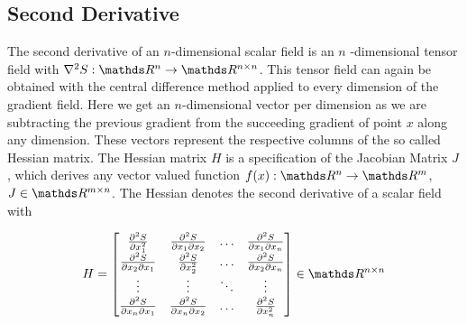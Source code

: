\subsection{Second Derivative}

The second derivative of an $n$-dimensional scalar field is an $n$
-dimensional tensor field with $\nabla^2 S:\real^n \rightarrow \real^{n
\times n}$. This tensor field can again be obtained with the central
difference method applied to every dimension of the gradient field. Here
we get an $n$-dimensional vector per dimension as we are subtracting the
previous gradient from the succeeding gradient of point $x$ along any
dimension. These vectors represent the respective columns of the so
called Hessian matrix. The Hessian matrix $H$ is a specification of the
Jacobian Matrix $J$, which derives any vector valued function $f(x):
\real^n \rightarrow \real^m$, $J \in \real^{m \times n}$. The Hessian
denotes the second derivative of a scalar field with

\begin{equation}
  H =
  \begin{bmatrix}
    \frac{\partial^2 S}{\partial x_1^2} & \frac{\partial^2 S}{\partial x_1 \partial x_2} & \dots & \frac{\partial^2 S}{\partial x_1 \partial x_n}\\
    \frac{\partial^2 S}{\partial x_2 \partial x_1} & \frac{\partial^2 S}{\partial x_2^2} & \dots & \frac{\partial^2 S}{\partial x_2 \partial x_n}\\
    \vdots & \vdots & \ddots & \vdots \\
    \frac{\partial^2 S}{\partial x_n \partial x_1} & \frac{\partial^2 S}{\partial x_n \partial x_2} & \dots & \frac{\partial^2 S}{\partial x_n^2}
  \end{bmatrix}
  \in \real^{n \times n}
\end{equation}

